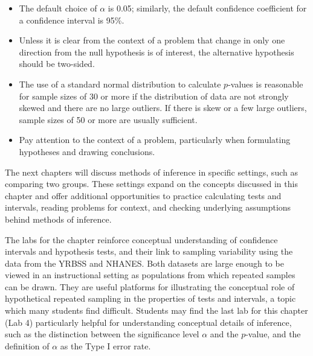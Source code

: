 \begin{itemize}
	\item The default choice of $\alpha$ is 0.05; similarly, the default confidence coefficient for a confidence interval is 95\%. 
	
	\item Unless it is clear from the context of a problem that change in only one direction from the null hypothesis is of interest, the alternative hypothesis should be two-sided.
	
	\item The use of a standard normal distribution to calculate $p$-values is reasonable for sample sizes of 30 or more if the distribution of data are not strongly skewed and there are no large outliers. If there is skew or a few large outliers, sample sizes of 50 or more are usually sufficient.
	
	\item Pay attention to the context of a problem, particularly when formulating hypotheses and drawing conclusions.
\end{itemize}

The next chapters will discuss methods of inference in specific settings, such as comparing two groups. These settings expand on the concepts discussed in this chapter and offer additional opportunities to practice calculating tests and intervals, reading problems for context, and checking underlying assumptions behind methods of inference.

The labs for the chapter reinforce conceptual understanding of confidence intervals and hypothesis tests, and their link to sampling variability using the data from the YRBSS and NHANES. Both datasets are large enough to be viewed in an instructional setting as populations from which repeated samples can be drawn.  They are useful platforms for illustrating the conceptual role of hypothetical repeated sampling in the properties of tests and intervals, a topic which many students find difficult. Students may find the last lab for this chapter (Lab 4) particularly helpful for understanding conceptual details of inference, such as the distinction between the significance level $\alpha$ and the $p$-value, and the definition of $\alpha$ as the Type I error rate.

